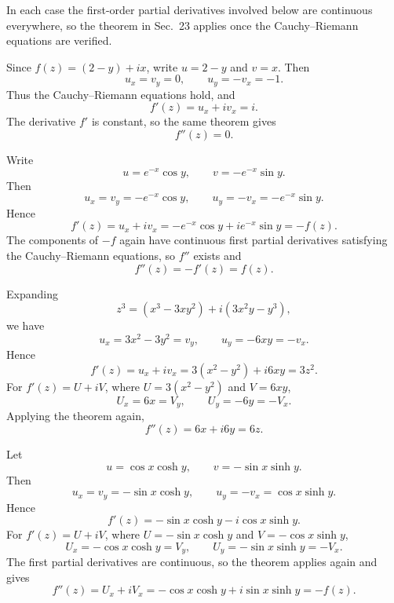 \documentclass[11pt,oneside]{article}
\begin{document}
\begin{solution}
In each case the first-order partial derivatives involved below are continuous everywhere, so the theorem in Sec.~23 applies once the Cauchy--Riemann equations are verified.
\begin{exercisesubparts}
    \item Since $f(z)=(2-y)+ix$, write $u=2-y$ and $v=x$. Then
    \[
        u_x=v_y=0, \qquad u_y=-v_x=-1.
    \]
    Thus the Cauchy--Riemann equations hold, and
    \[
        f'(z)=u_x+iv_x=i.
    \]
    The derivative \(f'\) is constant, so the same theorem gives
    \[
        \boxed{f''(z)=0}.
    \]

    \item Write
    \[
        u=e^{-x}\cos y,
        \qquad
        v=-e^{-x}\sin y.
    \]
    Then
    \[
        u_x=v_y=-e^{-x}\cos y,
        \qquad
        u_y=-v_x=-e^{-x}\sin y.
    \]
    Hence
    \[
        f'(z)=u_x+iv_x
        =-e^{-x}\cos y+i e^{-x}\sin y
        =-f(z).
    \]
    The components of \(-f\) again have continuous first partial derivatives satisfying the Cauchy--Riemann equations, so \(f''\) exists and
    \[
        \boxed{f''(z)=-f'(z)=f(z)}.
    \]

    \item Expanding
    \[
        z^3=(x^3-3xy^2)+i(3x^2y-y^3),
    \]
    we have
    \[
        u_x=3x^2-3y^2=v_y,
        \qquad
        u_y=-6xy=-v_x.
    \]
    Hence
    \[
        f'(z)=u_x+i v_x
        =3(x^2-y^2)+i6xy
        =3z^2.
    \]
    For \(f'(z)=U+iV\), where \(U=3(x^2-y^2)\) and \(V=6xy\),
    \[
        U_x=6x=V_y,
        \qquad
        U_y=-6y=-V_x.
    \]
    Applying the theorem again,
    \[
        \boxed{f''(z)=6x+i6y=6z}.
    \]

    \item Let
    \[
        u=\cos x\cosh y,
        \qquad
        v=-\sin x\sinh y.
    \]
    Then
    \[
        u_x=v_y=-\sin x\cosh y,
        \qquad
        u_y=-v_x=\cos x\sinh y.
    \]
    Hence
    \[
        f'(z)=-\sin x\cosh y-i\cos x\sinh y.
    \]
    For \(f'(z)=U+iV\), where \(U=-\sin x\cosh y\) and \(V=-\cos x\sinh y\),
    \[
        U_x=-\cos x\cosh y=V_y,
        \qquad
        U_y=-\sin x\sinh y=-V_x.
    \]
    The first partial derivatives are continuous, so the theorem applies again and gives
    \[
        \boxed{f''(z)=U_x+iV_x=-\cos x\cosh y+i\sin x\sinh y=-f(z)}.
    \]
\end{exercisesubparts}
\end{solution}
\end{document}
